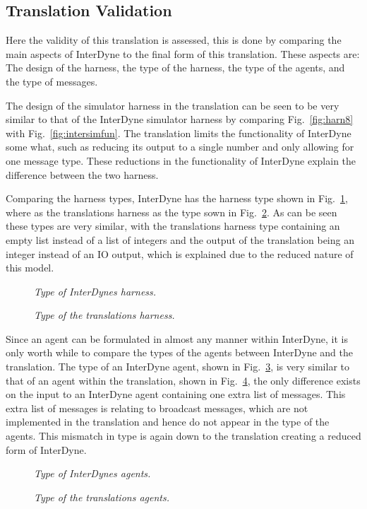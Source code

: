 \documentclass{article}
\begin{document}
\subsection{Translation Validation}
Here the validity of this translation is assessed, this is done by comparing the main aspects of InterDyne to the final form of this translation. These aspects are: The design of the harness, the type of the harness, the type of the agents, and the type of messages. 

The design of the simulator harness in the translation can be seen to be very similar to that of the InterDyne simulator harness by comparing Fig.~\ref{fig:harn8} with Fig.~\ref{fig:intersimfun}. The translation limits the functionality of InterDyne some what, such as reducing its output to a single number and only allowing for one message type. These reductions in the functionality of InterDyne explain the difference between the two harness.

Comparing the harness types, InterDyne has the harness type shown in Fig.~\ref{fig:harntypint}, where as the translations harness as the type sown in Fig.~\ref{fig:harntyptrans}. As can be seen these types are very similar, with the translations harness type containing an empty list instead of a list of integers and the output of the translation being an integer instead of an IO output, which is explained due to the reduced nature of this model. 
\begin{figure}[H]
	\centering
	
	\caption{\it Type of InterDynes harness.}
	\label{fig:harntypint}
\end{figure} 
\begin{figure}[H]
	\centering
	
	\caption{\it Type of the translations harness.}
	\label{fig:harntyptrans}
\end{figure} 

Since an agent can be formulated in almost any manner within InterDyne, it is only worth while to compare the types of the agents between InterDyne and the translation. The type of an InterDyne agent, shown in Fig.~\ref{fig:agentpint}, is very similar to that of an agent within the translation, shown in Fig.~\ref{fig:agenttrans}, the only difference exists on the input to an InterDyne agent containing one extra list of messages. This extra list of messages is relating to broadcast messages, which are not implemented in the translation and hence do not appear in the type of the agents. This mismatch in type is again down to the translation creating a reduced form of InterDyne. 
\begin{figure}[H]
	\centering
	
	\caption{\it Type of InterDynes agents.}
	\label{fig:agentpint}
\end{figure} 
\begin{figure}[H]
	\centering
	
	\caption{\it Type of the translations agents.}
	\label{fig:agenttrans}
\end{figure} 
\end{document}
